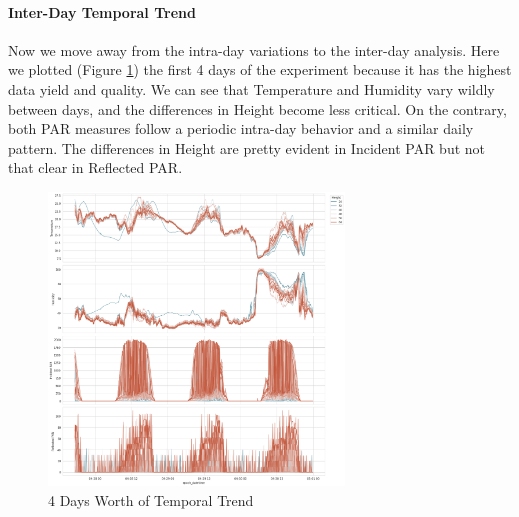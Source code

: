 \documentclass[11pt, letterpaper]{article}
\begin{document}
\paragraph{Inter-Day Temporal Trend}
Now we move away from the intra-day variations to the inter-day analysis. Here we plotted (Figure \ref{fig:ts_trend}) the first 4 days of the experiment because it has the highest data yield and quality. We can see that Temperature and Humidity vary wildly between days, and the differences in Height become less critical. On the contrary, both PAR measures follow a periodic intra-day behavior and a similar daily pattern. The differences in Height are pretty evident in Incident PAR but not that clear in Reflected PAR.
\begin{figure}[h!]
\centering
\includegraphics[width=0.7\textwidth]{eda_3.4.png}
\captionsetup{justification=centering}
\caption{4 Days Worth of Temporal Trend}
\label{fig:ts_trend}
\end{figure}
\end{document}
